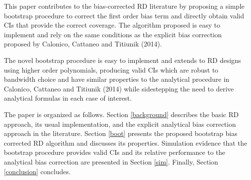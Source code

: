\documentclass[12pt,fleqn]{article}
\begin{document}
This paper contributes to the bias-corrected RD literature by proposing a simple
bootstrap procedure to correct the first order bias term and directly obtain 
valid CIs that provide the correct coverage. The algorithm proposed is easy to
implement and rely on the same conditions as the explicit bias correction
proposed by Calonico, Cattaneo and Titiunik (2014).

The novel bootstrap procedure is easy to implement and extends to RD designs 
using higher order polynomials, producing valid CIs which are robust to 
bandwidth choice and have similar properties to the analytical procedure in 
Calonico, Cattaneo and Titiunik (2014) while sidestepping the need to derive 
analytical formulas in each case of interest.

The paper is organized as follows. Section \ref{background} describes the basic
RD approach, its usual implementation, and the explicit analytical bias 
correction approach in the literature. Section \ref{boot} presents the proposed 
bootstrap bias corrected RD algorithm and discusses its properties. Simulation
evidence that the bootstrap procedure provides valid CIs and its relative 
performance to the analytical bias correction are presented in Section \ref{sim}.
Finally, Section \ref{conclusion} concludes.
\end{document}
